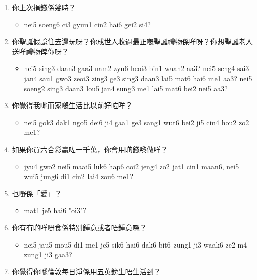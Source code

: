 \documentclass[12pt,a4paper]{leaflet}
\begin{document}
\begin{tcolorbox}[enhanced, breakable, skin first=enhanced, skin middle=enhanced, skin last=enhanced,colback=LightCoral!20!white, colframe=LightCoral!50!black, boxrule=0.5mm]
\begin{enumerate}[label={},leftmargin=0pt, itemindent=0pt]
\begin{itemize}[label={},leftmargin=0pt, itemindent=0pt]
\end{itemize}
\item \LARGE{你上次捐錢係幾時？}
\begin{itemize}[label={},leftmargin=0pt, itemindent=0pt]
\item \footnotesize\textsf{nei5 soeng6 ci3 gyun1 cin2 hai6 gei2 si4?}
\end{itemize}
\item \LARGE{你聖誕假諗住去邊玩呀？你成世人收過最正嘅聖誕禮物係咩呀？你想聖誕老人送咩禮物俾你呀？}
\begin{itemize}[label={},leftmargin=0pt, itemindent=0pt]
\item \footnotesize\textsf{nei5 sing3 daan3 gaa3 nam2 zyu6 heoi3 bin1 waan2 aa3? nei5 seng4 sai3 jan4 sau1 gwo3 zeoi3 zing3 ge3 sing3 daan3 lai5 mat6 hai6 me1 aa3? nei5 soeng2 sing3 daan3 lou5 jan4 sung3 me1 lai5 mat6 bei2 nei5 aa3?}
\end{itemize}
\item \LARGE{你覺得我哋而家嘅生活比以前好咗咩？}
\begin{itemize}[label={},leftmargin=0pt, itemindent=0pt]
\item \footnotesize\textsf{nei5 gok3 dak1 ngo5 dei6 ji4 gaa1 ge3 sang1 wut6 bei2 ji5 cin4 hou2 zo2 me1?}
\end{itemize}
\item \LARGE{如果你買六合彩贏咗一千萬，你會用啲錢嚟做咩？}
\begin{itemize}[label={},leftmargin=0pt, itemindent=0pt]
\item \footnotesize\textsf{jyu4 gwo2 nei5 maai5 luk6 hap6 coi2 jeng4 zo2 jat1 cin1 maan6, nei5 wui5 jung6 di1 cin2 lai4 zou6 me1?}
\end{itemize}
\item \LARGE{乜嘢係「愛」？}
\begin{itemize}[label={},leftmargin=0pt, itemindent=0pt]
\item \footnotesize\textsf{mat1 je5 hai6 "oi3"?}
\end{itemize}
\item \LARGE{你有冇啲咩嘢食係特別鍾意或者唔鍾意㗎？}
\begin{itemize}[label={},leftmargin=0pt, itemindent=0pt]
\item \footnotesize\textsf{nei5 jau5 mou5 di1 me1 je5 sik6 hai6 dak6 bit6 zung1 ji3 waak6 ze2 m4 zung1 ji3 gaa3?}
\end{itemize}
\item \LARGE{你覺得你喺倫敦每日淨係用五英鎊生唔生活到？}
\begin{itemize}[label={},leftmargin=0pt, itemindent=0pt]

\end{itemize}
\end{enumerate}
\end{tcolorbox}
\end{document}
